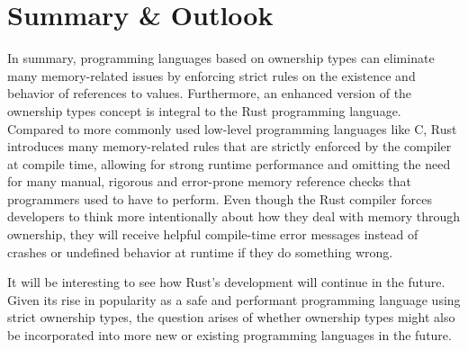 \documentclass[sigplan,11pt,nonacm]{acmart}
\begin{document}










\section{Summary \& Outlook}
\label{sec:summary}

In summary, programming languages based on ownership types can eliminate many memory-related issues by enforcing strict rules on the existence and behavior of references to values.
Furthermore, an enhanced version of the ownership types concept is integral to the Rust programming language.
Compared to more commonly used low-level programming languages like C, Rust introduces many memory-related rules that are strictly enforced by the compiler at compile time, allowing for strong runtime performance and omitting the need for many manual, rigorous and error-prone memory reference checks that programmers used to have to perform.
Even though the Rust compiler forces developers to think more intentionally about how they deal with memory through ownership, they will receive helpful compile-time error messages instead of crashes or undefined behavior at runtime if they do something wrong.

It will be interesting to see how Rust's development will continue in the future.
Given its rise in popularity as a safe and performant programming language using strict ownership types, the question arises of whether ownership types might also be incorporated into more new or existing programming languages in the future.



\end{document}
